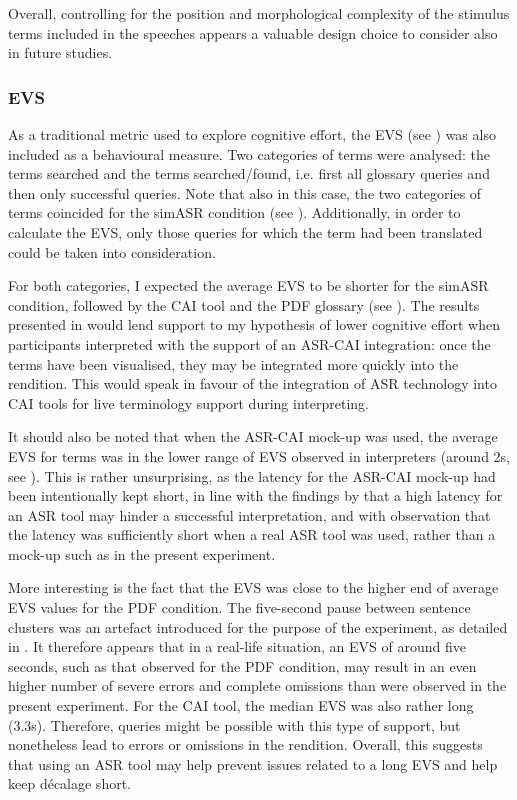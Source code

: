 Overall, controlling for the position and morphological complexity of the stimulus terms included in the speeches appears a valuable design choice to consider also in future studies.

\subsubsection{EVS} \label{EVSdisc}
As a traditional metric used to explore cognitive effort, the EVS (see ) was also included as a behavioural measure. Two categories of terms were analysed: the terms searched and the terms searched/found, i.e. first all glossary queries and then only successful queries. Note that also in this case, the two categories of terms coincided for the simASR condition (see ). Additionally, in order to calculate the EVS, only those queries for which the term had been translated could be taken into consideration.

For both categories, I expected the average EVS to be shorter for the simASR condition, followed by the CAI tool and the PDF glossary (see ). The results presented in  would lend support to my hypothesis of lower cognitive effort when participants interpreted with the support of an ASR-CAI integration: once the terms have been visualised, they may be integrated more quickly into the rendition. This would speak in favour of the integration of ASR technology into CAI tools for live terminology support during interpreting.

It should also be noted that when the ASR-CAI mock-up was used, the average EVS for terms was in the lower range of EVS observed in interpreters (around 2s, see ). This is rather unsurprising, as the latency for the ASR-CAI mock-up had been intentionally kept short, in line with the findings by \citet{montecchio_masterarbeit_maddalena_2021} that a high latency for an ASR tool may hinder a successful interpretation, and with  observation that the latency was sufficiently short when a real ASR tool was used, rather than a mock-up such as in the present experiment.

More interesting is the fact that the EVS was close to the higher end of average EVS values for the PDF condition. The five-second pause between sentence clusters was an artefact introduced for the purpose of the experiment, as detailed in . It therefore appears that in a real-life situation, an EVS of around five seconds, such as that observed for the PDF condition, may result in an even higher number of severe errors and complete omissions than were observed in the present experiment. For the CAI tool, the median EVS was also rather long (3.3s). Therefore, queries might be possible with this type of support, but nonetheless lead to errors or omissions in the rendition. Overall, this suggests that using an ASR tool may help prevent issues related to a long EVS and help keep décalage short.

